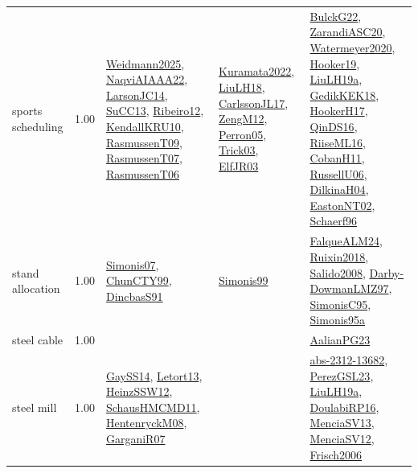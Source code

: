 {\begin{longtable}{p{3cm}r>{\raggedright\arraybackslash}p{6cm}>{\raggedright\arraybackslash}p{6cm}>{\raggedright\arraybackslash}p{8cm}}
\index{sports scheduling}\index{ApplicationAreas!sports scheduling}sports scheduling &  1.00 & \hyperref[detail:Weidmann2025]{Weidmann2025}, \hyperref[detail:NaqviAIAAA22]{NaqviAIAAA22}, \hyperref[detail:LarsonJC14]{LarsonJC14}, \hyperref[detail:SuCC13]{SuCC13}, \hyperref[detail:Ribeiro12]{Ribeiro12}, \hyperref[detail:KendallKRU10]{KendallKRU10}, \hyperref[detail:RasmussenT09]{RasmussenT09}, \hyperref[detail:RasmussenT07]{RasmussenT07}, \hyperref[detail:RasmussenT06]{RasmussenT06} & \hyperref[detail:Kuramata2022]{Kuramata2022}, \hyperref[detail:LiuLH18]{LiuLH18}, \hyperref[detail:CarlssonJL17]{CarlssonJL17}, \hyperref[detail:ZengM12]{ZengM12}, \hyperref[detail:Perron05]{Perron05}, \hyperref[detail:Trick03]{Trick03}, \hyperref[detail:ElfJR03]{ElfJR03} & \hyperref[detail:BulckG22]{BulckG22}, \hyperref[detail:ZarandiASC20]{ZarandiASC20}, \hyperref[detail:Watermeyer2020]{Watermeyer2020}, \hyperref[detail:Hooker19]{Hooker19}, \hyperref[detail:LiuLH19a]{LiuLH19a}, \hyperref[detail:GedikKEK18]{GedikKEK18}, \hyperref[detail:HookerH17]{HookerH17}, \hyperref[detail:QinDS16]{QinDS16}, \hyperref[detail:RiiseML16]{RiiseML16}, \hyperref[detail:CobanH11]{CobanH11}, \hyperref[detail:RussellU06]{RussellU06}, \hyperref[detail:DilkinaH04]{DilkinaH04}, \hyperref[detail:EastonNT02]{EastonNT02}, \hyperref[detail:Schaerf96]{Schaerf96}\\
\index{stand allocation}\index{ApplicationAreas!stand allocation}stand allocation &  1.00 & \hyperref[detail:Simonis07]{Simonis07}, \hyperref[detail:ChunCTY99]{ChunCTY99}, \hyperref[detail:DincbasS91]{DincbasS91} & \hyperref[detail:Simonis99]{Simonis99} & \hyperref[detail:FalqueALM24]{FalqueALM24}, \hyperref[detail:Ruixin2018]{Ruixin2018}, \hyperref[detail:Salido2008]{Salido2008}, \hyperref[detail:Darby-DowmanLMZ97]{Darby-DowmanLMZ97}, \hyperref[detail:SimonisC95]{SimonisC95}, \hyperref[detail:Simonis95a]{Simonis95a}\\
\index{steel cable}\index{ApplicationAreas!steel cable}steel cable &  1.00 &  &  & \hyperref[detail:AalianPG23]{AalianPG23}\\
\index{steel mill}\index{ApplicationAreas!steel mill}steel mill &  1.00 & \hyperref[detail:GaySS14]{GaySS14}, \hyperref[detail:Letort13]{Letort13}, \hyperref[detail:HeinzSSW12]{HeinzSSW12}, \hyperref[detail:SchausHMCMD11]{SchausHMCMD11}, \hyperref[detail:HentenryckM08]{HentenryckM08}, \hyperref[detail:GarganiR07]{GarganiR07} &  & \hyperref[detail:abs-2312-13682]{abs-2312-13682}, \hyperref[detail:PerezGSL23]{PerezGSL23}, \hyperref[detail:LiuLH19a]{LiuLH19a}, \hyperref[detail:DoulabiRP16]{DoulabiRP16}, \hyperref[detail:MenciaSV13]{MenciaSV13}, \hyperref[detail:MenciaSV12]{MenciaSV12}, \hyperref[detail:Frisch2006]{Frisch2006}\\

\end{longtable}}
